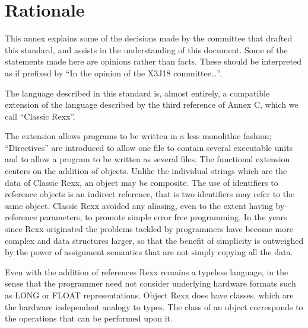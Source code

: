 \hypertarget{rationale}{%
\chapter{Rationale}\label{rationale}}

This annex explains some of the decisions made by the committee that
drafted this standard, and assists in the understanding of this
document. Some of the statements made here are opinions rather than
facts. These should be interpreted as if prefixed by ``In the opinion of
the X3J18 committee\ldots{}''.

The language described in this standard is, almost entirely, a
compatible extension of the language described by the third reference of
Annex C, which we call ``Classic Rexx''.

The extension allows programs to be written in a less monolithic
fashion; ``Directives'' are introduced to allow one file to contain
several executable units and to allow a program to be written as several
files. The functional extension centers on the addition of objects.
Unlike the individual strings which are the data of Classic Rexx, an
object may be composite. The use of identifiers to reference objects is
an indirect reference, that is two identifiers may refer to the same
object. Classic Rexx avoided any aliasing, even to the extent having
by-reference parameters, to promote simple error free programming. In
the years since Rexx originated the problems tackled by programmers have
become more complex and data structures larger, so that the benefit of
simplicity is outweighed by the power of assignment semantics that are
not simply copying all the data.

Even with the addition of references Rexx remains a typeless language,
in the sense that the programmer need not consider underlying hardware
formats such as LONG or FLOAT representations. Object Rexx does have
classes, which are the hardware independent analogy to types. The class
of an object corresponds to the operations that can be performed upon
it.
